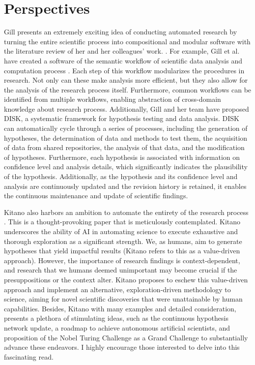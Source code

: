 \documentclass{book}
\begin{document}
\section{Perspectives}

Gill presents an extremely exciting idea of conducting automated research by turning the entire scientific process into compositional and modular software with the literature review of her and her colleagues' work. \cite{gil2022will}. For example, Gill et al. have created a software of the semantic workflow of scientific data analysis and computation process  \cite{gil2011semantic}. 
Each step of this workflow modularizes the procedures in research. Not only can these make analysis more efficient, but they also allow for the analysis of the research process itself. Furthermore, common workflows can be identified from multiple workflows, enabling abstraction of cross-domain knowledge about research process. Additionally, Gill and her team have proposed DISK, a systematic framework for hypothesis testing and data analysis. DISK can automatically cycle through a series of processes, including the generation of hypotheses, the determination of data and methods to test them, the acquisition of data from shared repositories, the analysis of that data, and the modification of hypotheses. Furthermore, each hypothesis is associated with information on confidence level and analysis details, which significantly indicates the plausibility of the hypothesis. Additionally, as the hypothesis and its confidence level and analysis are continuously updated and the revision history is retained, it enables the continuous maintenance and update of scientific findings.

Kitano also harbors an ambition to automate the entirety of the research process \cite{kitano2021nobel}. This is a thought-provoking paper that is meticulously contemplated. Kitano underscores the ability of AI in automating science to execute exhaustive and thorough exploration as a significant strength. We, as humans, aim to generate hypotheses that yield impactful results (Kitano refers to this as a value-driven approach). However, the importance of research findings is context-dependent, and research that we humans deemed unimportant may become crucial if the presuppositions or the context alter. Kitano proposes to eschew this value-driven approach and implement an alternative, exploration-driven methodology to science, aiming for novel scientific discoveries that were unattainable by human capabilities. Besides, Kitano with many examples and detailed consideration, presents a plethora of stimulating ideas, such as the continuous hypothesis network update, a roadmap to achieve autonomous artificial scientists, and proposition of the Nobel Turing Challenge as a Grand Challenge to substantially advance these endeavors. I highly encourage those interested to delve into this fascinating read.
\end{document}
